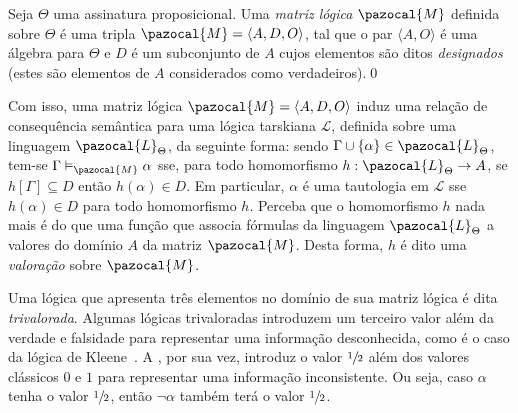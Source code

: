         \begin{definicao}
            Seja $\Theta$ uma assinatura proposicional. Uma \textit{matriz lógica} $\pazocal{M}$ definida sobre $\Theta$ é uma tripla $\pazocal{M} = \langle A, D, O \rangle$, tal que o par $\langle A, O \rangle$ é uma álgebra para $\Theta$ e $D$ é um subconjunto de $A$ cujos elementos são ditos \textit{designados} (estes são elementos de $A$ considerados como verdadeiros).\qed{}
        \end{definicao}

        Com isso, uma matriz lógica $\pazocal{M} = \langle A, D, O \rangle$ induz uma relação de consequência semântica para uma lógica tarskiana $\mathcal{L}$, definida sobre uma linguagem $\pazocal{L}_{\Theta}$, da seguinte forma: sendo $\Gamma \cup \{\alpha\} \in \pazocal{L}_{\Theta}$, tem-se $\Gamma \vDash_{\pazocal{M}} \alpha$ sse, para todo homomorfismo $h : \pazocal{L}_{\Theta} \to A$, se $h[\Gamma] \subseteq D$ então $h(\alpha) \in D$. Em particular, $\alpha$ é uma tautologia em $\mathcal{L}$ sse $h(\alpha) \in D$ para todo homomorfismo $h$. Perceba que o homomorfismo $h$ nada mais é do que uma função que associa fórmulas da linguagem $\pazocal{L}_{\Theta}$ a valores do domínio $A$ da matriz $\pazocal{M}$. Desta forma, $h$ é dito uma \textit{valoração} sobre $\pazocal{M}$.


       Uma lógica que apresenta três elementos no domínio de sua matriz lógica é dita \textit{trivalorada}. Algumas lógicas trivaloradas introduzem um terceiro valor além da verdade e falsidade para representar uma informação desconhecida, como é o caso da lógica de Kleene~\cite{manyvalued}. A \lfium{}, por sua vez, introduz o valor $\sfrac{1}{2}{}$ além dos valores clássicos $0$ e $1$ para representar uma informação inconsistente. Ou seja, caso $\alpha$ tenha o valor $\sfrac{1}{2}{}$, então $\neg \alpha$ também terá o valor $\sfrac{1}{2}{}$.

